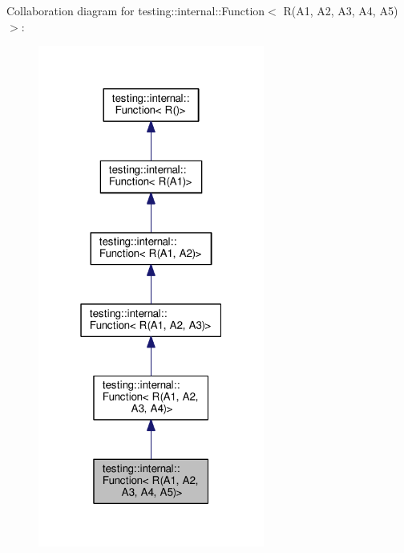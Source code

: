 Collaboration diagram for testing\+:\+:internal\+:\+:Function$<$ R(A1, A2, A3, A4, A5)$>$\+:
\nopagebreak
\begin{figure}[H]
\begin{center}
\leavevmode
\includegraphics[width=211pt]{structtesting_1_1internal_1_1_function_3_01_r_07_a1_00_01_a2_00_01_a3_00_01_a4_00_01_a5_08_4__coll__graph}
\end{center}
\end{figure}
